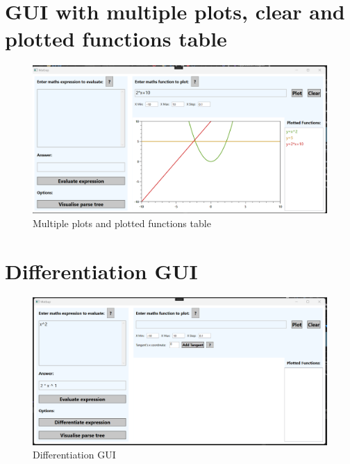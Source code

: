 \documentclass[a4paper, oneside, 11pt]{report}
\begin{document}
\section{GUI with multiple plots, clear and plotted functions table}
\begin{figure}[H]
\begin{center}
\includegraphics[scale=0.5]{MultiplePlotsGUI.png}
\caption{Multiple plots and plotted functions table}
\label{basicgui}
\end{center}
\end{figure}

\section{Differentiation GUI}
\begin{figure}[H]
\begin{center}
\includegraphics[scale=0.5]{DifferentiationGUI.png}
\caption{Differentiation GUI}
\label{basicgui}
\end{center}
\end{figure}
\end{document}
